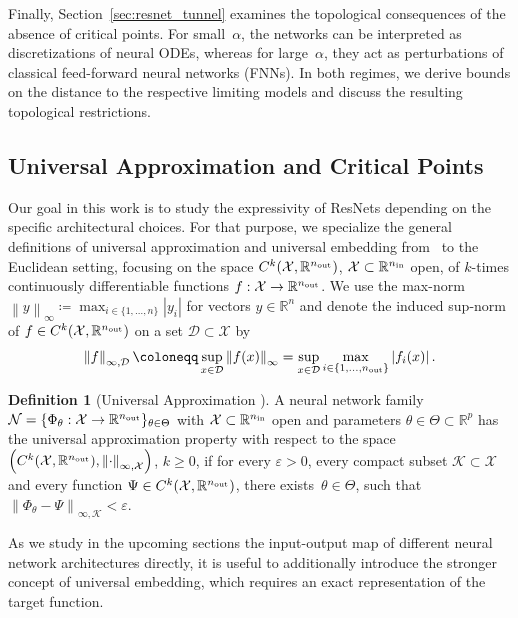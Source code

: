 \documentclass[10pt]{article}
\theoremstyle{definition}
\newtheorem{definition}[theorem]{Definition}
\numberwithin{equation}{section}
\newcommand\norm[1]{\left\lVert#1\right\rVert}
\newcommand\abs[1]{\left\lvert#1\right\rvert}
\newcommand{\R}{\mathbb{R}}
\newcommand*{\nout}{n_\textup{out}}
\newcommand*{\nin}{n_\textup{in}}
\begin{document}
Finally, Section~\ref{sec:resnet_tunnel} examines the topological consequences of the absence of critical points. For small~$\alpha$, the networks can be interpreted as discretizations of neural ODEs, whereas for large~$\alpha$, they act as perturbations of classical feed-forward neural networks (FNNs). In both regimes, we derive bounds on the distance to the respective limiting models and discuss the resulting topological restrictions.

\subsection{Universal Approximation and Critical Points}
\label{sec:resnet_universalapprox}

Our goal in this work is to study the expressivity of ResNets depending on the specific architectural choices. For that purpose, we specialize the general definitions of universal approximation and universal embedding from~\cite{kk2025} to the Euclidean setting, focusing on the space $C^k(\mathcal{X},\R^{\nout})$, $\mathcal{X}\subset \R^{\nin}$ open, of $k$-times continuously differentiable functions $f: \mathcal{X} \rightarrow \R^{\nout}$. We use the max-norm $\norm{y}_\infty \coloneqq \max_{i \in \{1,\ldots,n\}} \abs{y_i}$ for vectors $y\in \R^n$ and denote the induced sup-norm of $f \in C^k(\mathcal{X},\R^{\nout})$ on a set $\mathcal{D}\subset \mathcal{X}$ by
$$\norm{f}_{\infty,\mathcal{D}} \coloneqq \sup_{x \in \mathcal{D}} \norm{f(x)}_\infty = \sup_{x \in \mathcal{D}} \max_{i \in \{1,\ldots,\nout\}} \abs{f_i(x)}.$$


\begin{definition}[Universal Approximation \cite{kk2025}]
	A neural network family $\mathcal{N} = \{\Phi_\theta: \mathcal{X} \rightarrow \R^{\nout}\}_{\theta \in \Theta}$ with $\mathcal{X}\subset \R^{\nin}$ open and parameters $\theta\in \Theta \subset \R^p$ has the universal approximation property with respect to the space $\left( C^k(\mathcal{X},\R^{\nout}), \norm{\cdot}_{\infty,\mathcal{X}}\right)$, $k \geq 0$, if for every $\varepsilon >0$, every compact subset $\mathcal{K}\subset \mathcal{X}$ and every function $\Psi \in C^k(\mathcal{X},\R^{\nout})$, there exists~$\theta\in \Theta$, such that $\norm{\Phi_\theta-\Psi}_{\infty,\mathcal{K}} < \varepsilon$.
\end{definition}

As we study in the upcoming sections the input-output map  of different neural network architectures directly, it is useful to additionally introduce the stronger concept of universal embedding, which requires an exact representation of the target function.
\end{document}
